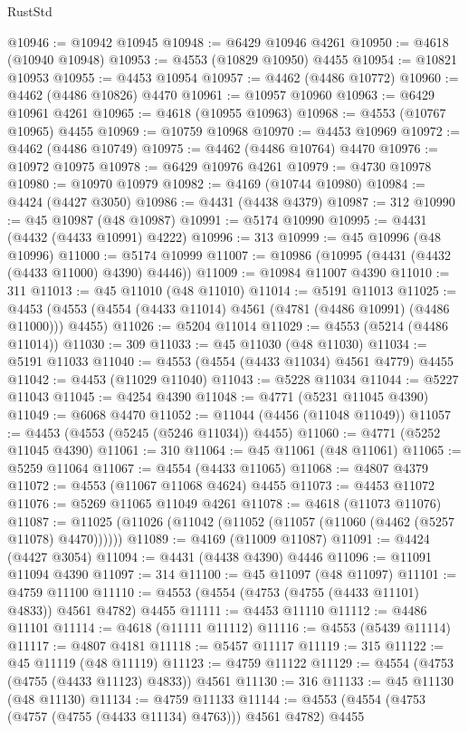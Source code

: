 \begin{lexlean}{RustStd}
\begin{coremodule}
@10946 := @10942 @10945
@10948 := @6429 @10946 @4261
@10950 := @4618 (@10940 @10948)
@10953 := @4553 (@10829 @10950) @4455
@10954 := @10821 @10953
@10955 := @4453 @10954
@10957 := @4462 (@4486 @10772)
@10960 := @4462 (@4486 @10826) @4470
@10961 := @10957 @10960
@10963 := @6429 @10961 @4261
@10965 := @4618 (@10955 @10963)
@10968 := @4553 (@10767 @10965) @4455
@10969 := @10759 @10968
@10970 := @4453 @10969
@10972 := @4462 (@4486 @10749)
@10975 := @4462 (@4486 @10764) @4470
@10976 := @10972 @10975
@10978 := @6429 @10976 @4261
@10979 := @4730 @10978
@10980 := @10970 @10979
@10982 := @4169 (@10744 @10980)
@10984 := @4424 (@4427 @3050)
@10986 := @4431 (@4438 @4379)
@10987 := 312
@10990 := @45 @10987 (@48 @10987)
@10991 := @5174 @10990
@10995 := @4431 (@4432 (@4433 @10991) @4222)
@10996 := 313
@10999 := @45 @10996 (@48 @10996)
@11000 := @5174 @10999
@11007 := @10986 (@10995 (@4431 (@4432 (@4433 @11000) @4390) @4446))
@11009 := @10984 @11007 @4390
@11010 := 311
@11013 := @45 @11010 (@48 @11010)
@11014 := @5191 @11013
@11025 := @4453 (@4553 (@4554 (@4433 @11014) @4561 (@4781 (@4486 @10991) (@4486 @11000))) @4455)
@11026 := @5204 @11014
@11029 := @4553 (@5214 (@4486 @11014))
@11030 := 309
@11033 := @45 @11030 (@48 @11030)
@11034 := @5191 @11033
@11040 := @4553 (@4554 (@4433 @11034) @4561 @4779) @4455
@11042 := @4453 (@11029 @11040)
@11043 := @5228 @11034
@11044 := @5227 @11043
@11045 := @4254 @4390
@11048 := @4771 (@5231 @11045 @4390)
@11049 := @6068 @4470
@11052 := @11044 (@4456 (@11048 @11049))
@11057 := @4453 (@4553 (@5245 (@5246 @11034)) @4455)
@11060 := @4771 (@5252 @11045 @4390)
@11061 := 310
@11064 := @45 @11061 (@48 @11061)
@11065 := @5259 @11064
@11067 := @4554 (@4433 @11065)
@11068 := @4807 @4379
@11072 := @4553 (@11067 @11068 @4624) @4455
@11073 := @4453 @11072
@11076 := @5269 @11065 @11049 @4261
@11078 := @4618 (@11073 @11076)
@11087 := @11025 (@11026 (@11042 (@11052 (@11057 (@11060 (@4462 (@5257 @11078) @4470))))))
@11089 := @4169 (@11009 @11087)
@11091 := @4424 (@4427 @3054)
@11094 := @4431 (@4438 @4390) @4446
@11096 := @11091 @11094 @4390
@11097 := 314
@11100 := @45 @11097 (@48 @11097)
@11101 := @4759 @11100
@11110 := @4553 (@4554 (@4753 (@4755 (@4433 @11101) @4833)) @4561 @4782) @4455
@11111 := @4453 @11110
@11112 := @4486 @11101
@11114 := @4618 (@11111 @11112)
@11116 := @4553 (@5439 @11114)
@11117 := @4807 @4181
@11118 := @5457 @11117
@11119 := 315
@11122 := @45 @11119 (@48 @11119)
@11123 := @4759 @11122
@11129 := @4554 (@4753 (@4755 (@4433 @11123) @4833)) @4561
@11130 := 316
@11133 := @45 @11130 (@48 @11130)
@11134 := @4759 @11133
@11144 := @4553 (@4554 (@4753 (@4757 (@4755 (@4433 @11134) @4763))) @4561 @4782) @4455

\end{coremodule}
\end{lexlean}
